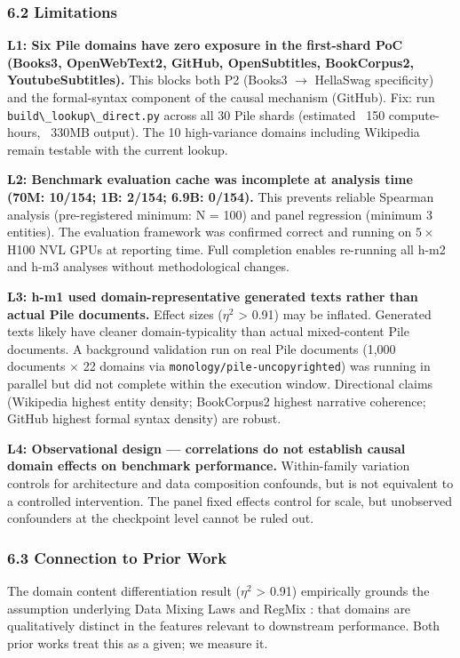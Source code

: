 \subsubsection{6.2 Limitations}

\textbf{L1: Six Pile domains have zero exposure in the first-shard PoC (Books3, OpenWebText2, GitHub, OpenSubtitles, BookCorpus2, YoutubeSubtitles).} This blocks both P2 (Books3 $\rightarrow$ HellaSwag specificity) and the formal-syntax component of the causal mechanism (GitHub). Fix: run \texttt{build\textbackslash \_lookup\textbackslash \_direct.py} across all 30 Pile shards (estimated ~150 compute-hours, ~330MB output). The 10 high-variance domains including Wikipedia remain testable with the current lookup.

\textbf{L2: Benchmark evaluation cache was incomplete at analysis time (70M: 10/154; 1B: 2/154; 6.9B: 0/154).} This prevents reliable Spearman analysis (pre-registered minimum: N = 100) and panel regression (minimum 3 entities). The evaluation framework was confirmed correct and running on $5\times$ H100 NVL GPUs at reporting time. Full completion enables re-running all h-m2 and h-m3 analyses without methodological changes.

\textbf{L3: h-m1 used domain-representative generated texts rather than actual Pile documents.} Effect sizes ($\eta^2$ > 0.91) may be inflated. Generated texts likely have cleaner domain-typicality than actual mixed-content Pile documents. A background validation run on real Pile documents (1,000 documents $\times$ 22 domains via \texttt{monology/pile-uncopyrighted}) was running in parallel but did not complete within the execution window. Directional claims (Wikipedia highest entity density; BookCorpus2 highest narrative coherence; GitHub highest formal syntax density) are robust.

\textbf{L4: Observational design --- correlations do not establish causal domain effects on benchmark performance.} Within-family variation controls for architecture and data composition confounds, but is not equivalent to a controlled intervention. The panel fixed effects control for scale, but unobserved confounders at the checkpoint level cannot be ruled out.

\subsubsection{6.3 Connection to Prior Work}

The domain content differentiation result ($\eta^2$ > 0.91) empirically grounds the assumption underlying Data Mixing Laws \citep{Ye2024} and RegMix \citep{Liu2024}: that domains are qualitatively distinct in the features relevant to downstream performance. Both prior works treat this as a given; we measure it.

